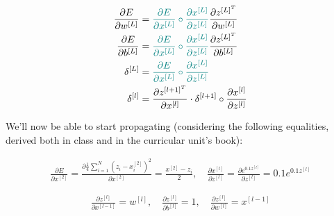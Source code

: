 \documentclass[12pt]{article}
\begin{document}
\begin{enumerate}[leftmargin=\labelsep]
        \begin{align*}
          \frac{\partial E}{\partial w^{[L]}} & = \textcolor{teal}{\frac{\partial E}{\partial x^{[L]}} \circ
            \frac{\partial x^{[L]}}{\partial z^{[L]}}}
          \frac{\partial z^{[L]^T}}{\partial w^{[L]}}                                                    \\
          \frac{\partial E}{\partial b^{[L]}} & = \textcolor{teal}{\frac{\partial E}{\partial x^{[L]}} \circ
            \frac{\partial x^{[L]}}{\partial z^{[L]}}}
          \frac{\partial z^{[L]^T}}{\partial b^{[L]}}                                                    \\
          \delta^{[L]}                        & = \textcolor{teal}{\frac{\partial E}{\partial x^{[L]}} \circ
          \frac{\partial x^{[L]}}{\partial z^{[L]}}}                                                   \\
          \delta^{[l]}                        & =
          \frac{\partial z^{[l + 1]^T}}{\partial x^{[l]}} \cdot \delta^{[l + 1]} \circ \frac{\partial x^{[l]}}{\partial z^{[l]}}
        \end{align*}

        We'll now be able to start propagating (considering the following equalities,
        derived both in class and in the curricular unit's book):

        
        \begin{equation*}
          \begin{aligned}
            \frac{\partial E}{\partial x^{[2]}} = \frac{\partial \frac{1}{4}\sum_{i=1}^N (z_i - x_i^{[2]})^2}{\partial x^{[2]}} = \frac{x^{[2]} - z_i}{2}, \quad
            \frac{\partial x^{[l]}}{\partial z^{[l]}} = \frac{\partial e^{0.1z^{[l]}}}{\partial z^{[l]}} = 0.1e^{0.1z^{[l]}}
          \end{aligned}
        \end{equation*}

        \begin{equation*}
          \begin{aligned}
            \frac{\partial z^{[l]}}{\partial x^{[l - 1]}} = w^{[l]}, \quad
            \frac{\partial z^{[l]}}{\partial b^{[l]}} = 1, \quad
            \frac{\partial z^{[l]}}{\partial w^{[l]}} = x^{[l - 1]}
          \end{aligned}
        \end{equation*}


\end{enumerate}
\end{document}
